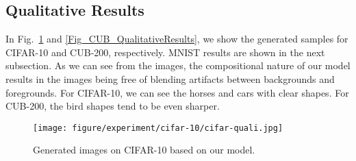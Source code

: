 \documentclass{article} \usepackage{iclr2017_conference,times}
\begin{document}
\subsection{Qualitative Results}
\vspace{-5pt}
In Fig.~\ref{Fig_CIFAR_QualitativeResults} and \ref{Fig_CUB_QualitativeResults}, we show the generated samples for CIFAR-10 and CUB-200, respectively. MNIST results are shown in the next subsection. As we can see from the images, the compositional nature of our model results in the images being free of blending artifacts between backgrounds and foregrounds. For CIFAR-10, we can see the horses and cars with clear shapes. For CUB-200, the bird shapes tend to be even sharper.
\begin{figure}[t]
 \begin{minipage}{1\textwidth}
    \center
\texttt{[image: figure/experiment/cifar-10/cifar-quali.jpg]}
  \end{minipage}    
  \caption{Generated images on CIFAR-10 based on our model.}
\label{Fig_CIFAR_QualitativeResults}
\end{figure}
\end{document}
